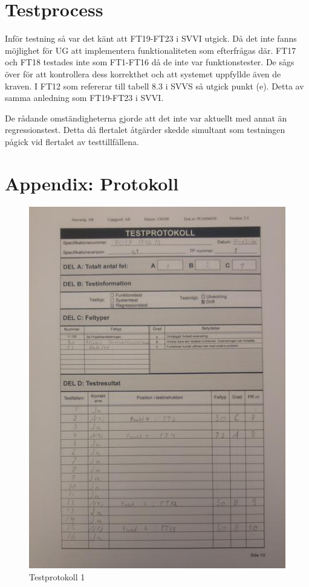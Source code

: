 \documentclass[paper=a4, fontsize=11pt,twoside]{article}
\begin{document}
\section{Testprocess}
Inför testning så var det känt att FT19-FT23 i SVVI utgick. Då det inte fanns möjlighet för UG att implementera funktionaliteten som efterfrågas där. FT17 och FT18 testades inte som FT1-FT16 då de inte var funktionstester. De sågs över för att kontrollera dess korrekthet och att systemet uppfyllde även de kraven. I FT12 som refererar till tabell 8.3 i SVVS så utgick punkt (e). Detta av samma anledning som FT19-FT23 i SVVI.

De rådande omständigheterna gjorde att det inte var aktuellt med annat än regressionstest. Detta då flertalet åtgärder skedde simultant som testningen pågick vid flertalet av testtillfällena.
\section{Appendix: Protokoll}

\begin{figure}[h]
\centering
\includegraphics[width=0.65\linewidth]{test1.jpg}
\caption{Testprotokoll 1}
\label{fig:20170322135702}
\end{figure}
\end{document}
